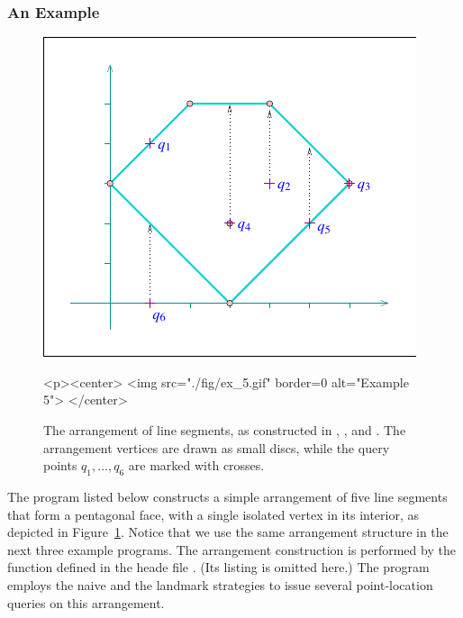 \subsubsection{An Example\label{arr_sssec:pl_ex}}
\begin{figure}[t]
\begin{ccTexOnly}
  \begin{center}
  \includegraphics{Arrangement_on_surface_2/fig/ex_5}
  \end{center}
\end{ccTexOnly}
\begin{ccHtmlOnly}
  <p><center>
  <img src="./fig/ex_5.gif" border=0 alt="Example 5">
  </center>
\end{ccHtmlOnly}
\caption{The arrangement of line segments, as constructed in
, , and
. The
arrangement vertices are drawn as small discs, while the query
points $q_1, \ldots, q_6$ are marked with crosses.\label{arr_fig:ex_5}}
\end{figure}

The program listed below constructs a simple arrangement of five line
segments that form a pentagonal face, with a single isolated
vertex in its interior, as depicted in Figure~\ref{arr_fig:ex_5}.
Notice that we use the same arrangement structure in the next
three example programs. The arrangement construction is performed by
the function  defined in the heade file
. (Its listing is omitted here.) The
program employs the naive and the landmark strategies to issue
several point-location queries on this arrangement.


